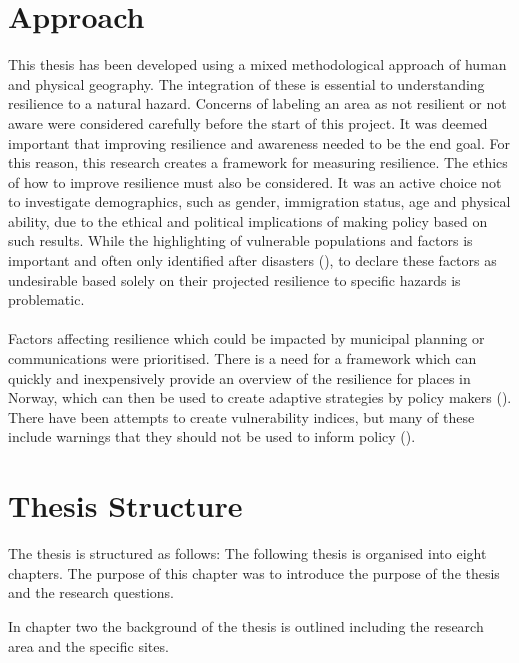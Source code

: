\section{Approach}

This thesis has been developed using a mixed methodological approach of human and physical geography. The integration of these is essential to understanding resilience to a natural hazard. Concerns of labeling an area as not resilient or not aware were considered carefully before the start of this project.  It was deemed important that improving resilience and awareness needed to be the end goal. For this reason, this research creates a framework for measuring resilience. The ethics of how to improve resilience must also be considered. It was an active choice not to investigate demographics, such as gender, immigration status, age and physical ability, due to the ethical and political implications of making policy based on such results. While the highlighting of vulnerable populations and factors is important and often only identified after disasters (\cite{cutter_community_2020}), to declare these factors as undesirable based solely on their projected resilience to specific hazards is problematic. 

\paragraph{}
Factors affecting resilience which could be impacted by municipal planning or communications were prioritised. There is a need for a framework which can quickly and inexpensively provide an overview of the resilience for places in Norway, which can then be used to create adaptive strategies by policy makers (\cite{opach_seeking_2020}). There have been attempts to create vulnerability indices, but many of these include warnings that they should not be used to inform policy (\cite{opach_seeking_2020}).


\section{Thesis Structure}
The thesis is structured as follows: 
The following thesis is organised into eight chapters. The purpose of this chapter was to introduce the purpose of the thesis and the research questions.

In chapter two the background of the thesis is outlined including the research area and the specific sites. 

